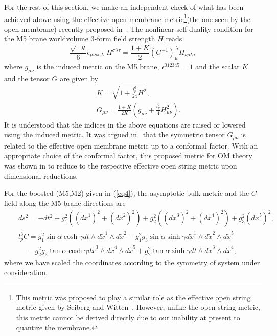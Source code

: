 \documentclass[a4paper,12pt]{article}
\begin{document}
For the rest of this section, we make an independent check of what has
been achieved above using the effective open membrane
metric\footnote{This metric was proposed to play a similar role as the
effective open string metric given by Seiberg and
Witten~\cite{SW}. However, unlike the open string metric,
this metric cannot be derived directly due to our inability at present
to quantize the membrane.}(the one seen by the open membrane) 
recently proposed in~\cite{Berg,Berg2}. The nonlinear 
self-duality condition for the M5 brane worldvolume 3-form field
strength $H$  reads \cite{Howe}
\begin{equation}
\label{3eq1}
\frac{\sqrt{-g}}{6}\epsilon_{\mu\nu\rho \sigma \lambda \tau}H^{\sigma
  \lambda \tau}=\frac{1+K}{2}(G^{-1})_{\mu}^{\, \lambda}H_{\nu\rho\lambda},
\end{equation}
where $g_{\mu\nu}$ is the induced metric on the M5 brane,
 $\epsilon^{012345}=1$ and the scalar $K$ and the tensor $G$ are given 
by 
\begin{eqnarray}
\label{3eq2}
&& K=\sqrt{1+\frac{l_p^6}{24}H^2}, \nonumber \\
&& G_{\mu\nu}=\frac{1+K}{2K}\left (g_{\mu\nu} +\frac{l_p^6}{4}H^2_{\mu\nu}
  \right ).
\end{eqnarray}
It is understood that the indices in the above equations are raised or
lowered using the induced metric. It was argued in~\cite{Berg,Berg2}
that the symmetric tensor $G_{\mu\nu}$ is related to  the effective
open membrane metric up to a conformal factor.
With an appropriate choice of the conformal factor, this 
proposed metric for OM theory was shown in \cite{Berg2} to reduce to 
the respective effective open string 
metric upon dimensional reductions.


For the boosted (M5,M2) given in (\ref{eq4}), the asymptotic bulk metric
and the $C$ field along the M5 brane directions are
\begin{eqnarray}
\label{3eq3}
&& ds^2 =-dt^2 + g^2_1 \left((d\tilde x^1)^2 +(d\tilde x^2)^2\right)
 + g^2_2 \left((d\tilde x^3)^2 + (d\tilde x^4)^2\right) + g^2_3 (d\tilde
 x^5)^2, \nonumber \\
&& l_p^3 C = g^2_1 \sin\alpha \cosh\gamma dt\wedge d\tilde x^1 \wedge
 d\tilde x^2 - g^2_1 g_3 \sin\alpha
 \sinh\gamma d\tilde x^1\wedge d\tilde x^2 \wedge d\tilde x^5 \nonumber \\
&& ~~~~~ - g^2_2 g_3 \tan\alpha \cosh\gamma d\tilde x^3 \wedge d\tilde
 x^4 \wedge d\tilde x^5 +
    g^2_2 \tan\alpha \sinh\gamma dt \wedge d\tilde x^3 \wedge d\tilde x^4,
\end{eqnarray}
where we have scaled the coordinates according to the symmetry of system
under consideration.
\end{document}
